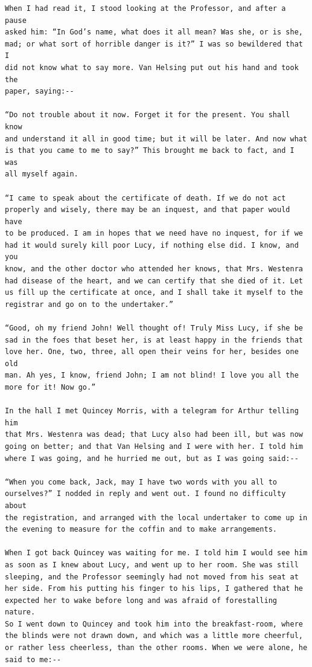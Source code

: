 \documentclass{article}
\begin{document}
\begin{verbatim}
When I had read it, I stood looking at the Professor, and after a pause
asked him: “In God’s name, what does it all mean? Was she, or is she,
mad; or what sort of horrible danger is it?” I was so bewildered that I
did not know what to say more. Van Helsing put out his hand and took the
paper, saying:--

“Do not trouble about it now. Forget it for the present. You shall know
and understand it all in good time; but it will be later. And now what
is that you came to me to say?” This brought me back to fact, and I was
all myself again.

“I came to speak about the certificate of death. If we do not act
properly and wisely, there may be an inquest, and that paper would have
to be produced. I am in hopes that we need have no inquest, for if we
had it would surely kill poor Lucy, if nothing else did. I know, and you
know, and the other doctor who attended her knows, that Mrs. Westenra
had disease of the heart, and we can certify that she died of it. Let
us fill up the certificate at once, and I shall take it myself to the
registrar and go on to the undertaker.”

“Good, oh my friend John! Well thought of! Truly Miss Lucy, if she be
sad in the foes that beset her, is at least happy in the friends that
love her. One, two, three, all open their veins for her, besides one old
man. Ah yes, I know, friend John; I am not blind! I love you all the
more for it! Now go.”

In the hall I met Quincey Morris, with a telegram for Arthur telling him
that Mrs. Westenra was dead; that Lucy also had been ill, but was now
going on better; and that Van Helsing and I were with her. I told him
where I was going, and he hurried me out, but as I was going said:--

“When you come back, Jack, may I have two words with you all to
ourselves?” I nodded in reply and went out. I found no difficulty about
the registration, and arranged with the local undertaker to come up in
the evening to measure for the coffin and to make arrangements.

When I got back Quincey was waiting for me. I told him I would see him
as soon as I knew about Lucy, and went up to her room. She was still
sleeping, and the Professor seemingly had not moved from his seat at
her side. From his putting his finger to his lips, I gathered that he
expected her to wake before long and was afraid of forestalling nature.
So I went down to Quincey and took him into the breakfast-room, where
the blinds were not drawn down, and which was a little more cheerful,
or rather less cheerless, than the other rooms. When we were alone, he
said to me:--


\end{verbatim}
\end{document}

